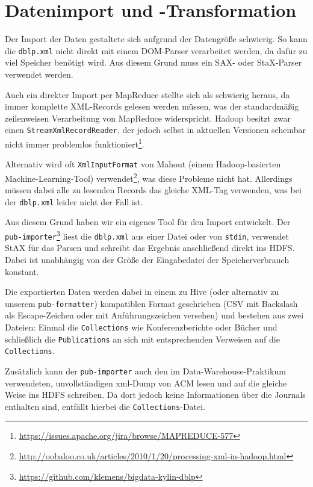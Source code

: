 \documentclass[a4paper,11pt,utf8]{scrartcl}
\begin{document}
\section{Datenimport und -Transformation}

Der Import der Daten gestaltete sich aufgrund der Datengröße schwierig. So kann die \texttt{dblp.xml} nicht direkt mit einem DOM-Parser verarbeitet werden, da dafür zu viel Speicher benötigt wird. Aus diesem Grund muss ein SAX- oder StaX-Parser verwendet werden.

Auch ein direkter Import per MapReduce stellte sich als schwierig heraus, da immer komplette XML-Records gelesen werden müssen, was der standardmäßig zeilenweisen Verarbeitung von MapReduce widerspricht. Hadoop besitzt zwar einen \texttt{StreamXmlRecordReader}, der jedoch selbst in aktuellen Versionen scheinbar nicht immer problemlos funktioniert\footnote{\url{https://issues.apache.org/jira/browse/MAPREDUCE-577}}.

Alternativ wird oft \texttt{XmlInputFormat} von Mahout (einem Hadoop-basierten Machine-Learning-Tool) verwendet\footnote{\url{http://oobaloo.co.uk/articles/2010/1/20/processing-xml-in-hadoop.html}}, was diese Probleme nicht hat. Allerdings müssen dabei alle zu lesenden Records das gleiche XML-Tag verwenden, was bei der \texttt{dblp.xml} leider nicht der Fall ist.

Aus diesem Grund haben wir ein eigenes Tool für den Import entwickelt. Der \texttt{pub-importer}\footnote{\url{https://github.com/klemens/bigdata-kylin-dblp}} liest die \texttt{dblp.xml} aus einer Datei oder von \texttt{stdin}, verwendet StAX für das Parsen und schreibt das Ergebnis anschließend direkt ins HDFS. Dabei ist unabhängig von der Größe der Eingabedatei der Speicherverbrauch konstant.

Die exportierten Daten werden dabei in einem zu Hive (oder alternativ zu unserem \texttt{pub-formatter}) kompatiblen Format geschrieben (CSV mit Backslash als Escape-Zeichen oder mit Anführungszeichen versehen) und bestehen aus zwei Dateien: Einmal die \texttt{Collections} wie Konferenzberichte oder Bücher und schließlich die \texttt{Publications} an sich mit entsprechenden Verweisen auf die \texttt{Collections}.

Zusätzlich kann der \texttt{pub-importer} auch den im Data-Warehouse-Praktikum verwendeten, unvollständigen xml-Dump von ACM lesen und auf die gleiche Weise ins HDFS schreiben. Da dort jedoch keine Informationen über die Journals enthalten sind, entfällt hierbei die \texttt{Collections}-Datei.
\end{document}
